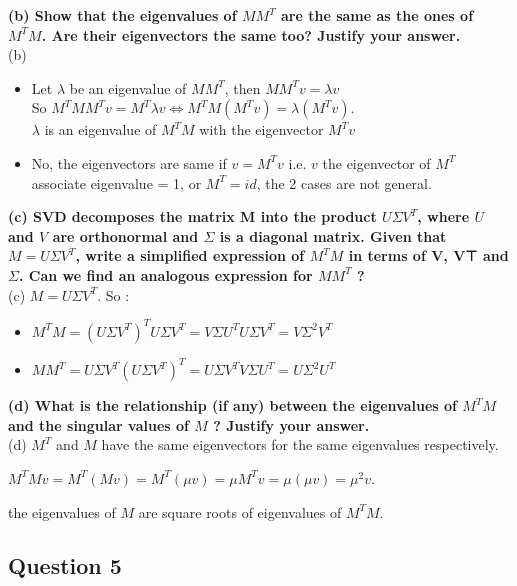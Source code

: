\documentclass{article}
\begin{document}
\vspace{1em}
{\bf (b) Show that the eigenvalues of $MM^{T}$ are the same as the ones of $M^{T}M$. Are their eigenvectors the same too? Justify your answer.}\\

(b)
\begin{itemize}
	\item Let $\lambda$ be an eigenvalue of $MM^T$, then $MM^Tv=\lambda v$ \\   So $M^TMM^Tv=M^T \lambda v \iff M^TM(M^Tv)=\lambda (M^T v)$. \\  $\lambda$ is an eigenvalue of $M^TM$ with the eigenvector $M^T v$

	\item No, the eigenvectors are same if $v = M^T v$ i.e. $v$ the eigenvector of $M^T$ associate eigenvalue = 1, or $M^T = id$, the 2 cases are not general.
\end{itemize}


\vspace{1em}
{\bf (c) SVD decomposes the matrix M into the product $U\Sigma V^T$, where $U$ and $V$ are orthonormal and $\Sigma$ is a diagonal matrix. Given that $M=U\Sigma V^T$, write a simplified expression of $M^{T}M$ in terms of V, V⊤ and $\Sigma$. Can we find an analogous expression for $MM^{T}$ ?}\\

(c) $M=U\Sigma V^T$. So :

\begin{itemize}
	\item $M^{T}M=(U\Sigma V^T)^T U\Sigma V^T= V \Sigma U^T U\Sigma V^T=V \Sigma^2 V^T$
	\item $MM^{T}= U\Sigma V^T (U\Sigma V^T)^T = U\Sigma V^TV\Sigma U^T = U \Sigma^2U^T $
\end{itemize}



\vspace{1em}
{\bf (d) What is the relationship (if any) between the eigenvalues of $M^{T}M$ and the singular values of $M$ ? Justify your answer.}\\


(d) $M^T$ and $M$ have the same eigenvectors for the same eigenvalues respectively.

$M^TMv=M^T(Mv)=M^T(\mu v)=\mu M^Tv=\mu (\mu v)=\mu^2 v$.

the eigenvalues of $M$ are square roots of eigenvalues of $M^TM$. 

\newpage
\subsection{Question 5}
\end{document}

